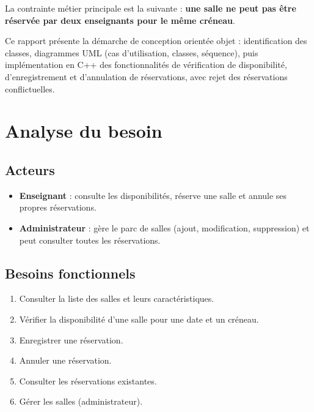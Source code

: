 \documentclass[12pt,a4paper]{report}
\begin{document}
La contrainte métier principale est la suivante : \textbf{une salle ne peut pas
être réservée par deux enseignants pour le même créneau}.

Ce rapport présente la démarche de conception orientée objet : identification
des classes, diagrammes UML (cas d'utilisation, classes, séquence), puis
implémentation en C++ des fonctionnalités de vérification de disponibilité,
d'enregistrement et d'annulation de réservations, avec rejet des réservations
conflictuelles.

\chapter{Analyse du besoin}

\section{Acteurs}
\begin{itemize}
  \item \textbf{Enseignant} : consulte les disponibilités, réserve une salle et annule ses propres réservations.
  \item \textbf{Administrateur} : gère le parc de salles (ajout, modification, suppression) et peut consulter toutes les réservations.
\end{itemize}

\section{Besoins fonctionnels}
\begin{enumerate}
  \item Consulter la liste des salles et leurs caractéristiques.
  \item Vérifier la disponibilité d'une salle pour une date et un créneau.
  \item Enregistrer une réservation.
  \item Annuler une réservation.
  \item Consulter les réservations existantes.
  \item Gérer les salles (administrateur).
\end{enumerate}
\end{document}
